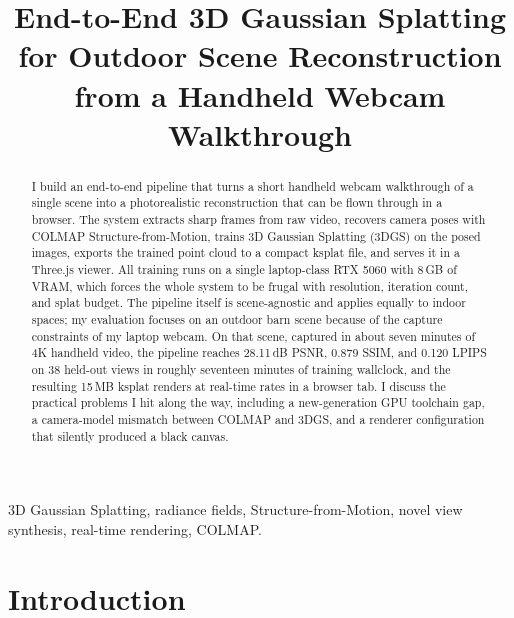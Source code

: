 \documentclass[conference]{IEEEtran}
\begin{document}
\title{End-to-End 3D Gaussian Splatting for Outdoor Scene Reconstruction from a Handheld Webcam Walkthrough}

\author{
}

\maketitle

\begin{abstract}
I build an end-to-end pipeline that turns a short handheld webcam walkthrough of a single scene into a photorealistic reconstruction that can be flown through in a browser. The system extracts sharp frames from raw video, recovers camera poses with COLMAP Structure-from-Motion, trains 3D Gaussian Splatting (3DGS) on the posed images, exports the trained point cloud to a compact ksplat file, and serves it in a Three.js viewer. All training runs on a single laptop-class RTX 5060 with 8\,GB of VRAM, which forces the whole system to be frugal with resolution, iteration count, and splat budget. The pipeline itself is scene-agnostic and applies equally to indoor spaces; my evaluation focuses on an outdoor barn scene because of the capture constraints of my laptop webcam. On that scene, captured in about seven minutes of 4K handheld video, the pipeline reaches 28.11\,dB PSNR, 0.879 SSIM, and 0.120 LPIPS on 38 held-out views in roughly seventeen minutes of training wallclock, and the resulting 15\,MB ksplat renders at real-time rates in a browser tab. I discuss the practical problems I hit along the way, including a new-generation GPU toolchain gap, a camera-model mismatch between COLMAP and 3DGS, and a renderer configuration that silently produced a black canvas.
\end{abstract}

\begin{IEEEkeywords}
3D Gaussian Splatting, radiance fields, Structure-from-Motion, novel view synthesis, real-time rendering, COLMAP.
\end{IEEEkeywords}

\section{Introduction}
\end{document}
